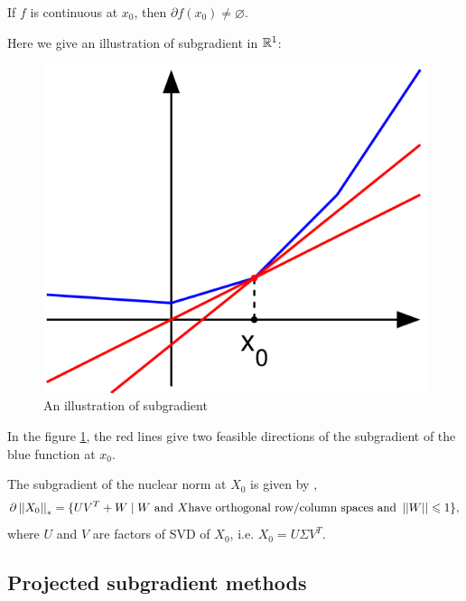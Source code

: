 \documentclass[11pt]{article}
\begin{document}
\begin{remark}
    If \(f\) is continuous at \(x_0\), then \(\partial f(x_0) \neq \varnothing\).
\end{remark}

Here we give an illustration of subgradient in \(\mathbb R^1\):
\begin{figure}[H]
    \centering
    \includegraphics[scale=0.3]{img/Subderivative_illustration.png}
    \setlength{\abovecaptionskip}{0cm}
    \caption{An illustration of subgradient}
    \label{fig:subgradient}
\end{figure}

In the figure \ref{fig:subgradient}, the red lines give two feasible directions of the subgradient of the blue function at \(x_0\).

\begin{proposition}
    The subgradient of the nuclear norm at \(X_0\) is given by \cite{lewis2003mathematics},\cite{watson1992characterization}
    \[\partial \left|\left|X_0\right|\right|_* = \{UV^T+W \mid W \text{ and } X \text{have orthogonal row/column spaces and } \left|\left|W\right|\right| \leqslant 1 \},\]
    where \(U\) and \(V\) are factors of SVD of \(X_0\), i.e. \(X_0=U\Sigma V^T.\)
\end{proposition}


\subsection{Projected subgradient methods}
\end{document}
